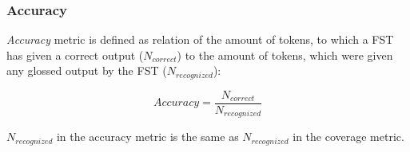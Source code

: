 \subsubsection*{Accuracy}
\textit{Accuracy} metric is defined as relation of the amount of tokens, to which a FST has given a correct output ($N_{correct}$) to the amount of tokens, which were given any glossed output by the FST ($N_{recognized}$):

\[Accuracy = \frac{N_{correct}}{N_{recognized}}\]

$N_{recognized}$ in the accuracy metric is the same as $N_{recognized}$ in the coverage metric. 